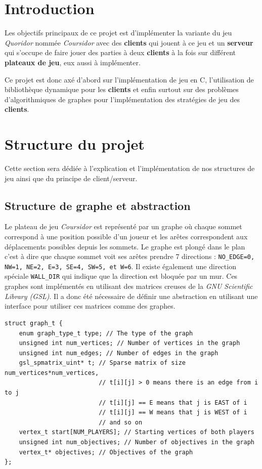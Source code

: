 
\section{Introduction}

Les objectifs principaux de ce projet est d'implémenter la variante du jeu \textit{Quoridor} nommée \textit{Coursidor} avec des \textbf{clients} qui jouent à ce jeu et un \textbf{serveur} qui s'occupe de faire jouer des parties à deux \textbf{clients} à la fois sur différent \textbf{plateaux de jeu}, eux aussi à implémenter.
\bigskip

Ce projet est donc axé d'abord sur l'implémentation de jeu en C, l'utilisation de bibliothèque dynamique pour les \textbf{clients} et enfin surtout sur des problèmes d'algorithmiques de graphes pour l'implémentation des stratégies de jeu des \textbf{clients}.

\section{Structure du projet}

Cette section sera dédiée à l'explication et l'implémentation de nos structures de jeu ainsi que du principe de client/serveur.

\subsection{Structure de graphe et abstraction}

Le plateau de jeu \textit{Coursidor} est représenté par un graphe où chaque sommet correspond à une position possible d'un joueur et les arêtes correspondent aux déplacements possibles depuis les sommets.
Le graphe est plongé dans le plan c'est à dire que chaque sommet voit ses arêtes prendre 7 directions : \texttt{NO\_EDGE=0, NW=1, NE=2, E=3, SE=4, SW=5, et W=6}.
Il existe également une direction spéciale \texttt{WALL\_DIR} qui indique que la direction est bloquée par un mur.
Ces graphes sont implémentés en utilisant des matrices creuses de la \textit{GNU Scientific Library (GSL)}.
Il a donc été nécessaire de définir une abstraction en utilisant une interface pour utiliser ces matrices comme des graphes.

\begin{lstlisting}[style=customc, label={lst:graph}, caption={Définition du type graph\_t}]
  struct graph_t {
    enum graph_type_t type; // The type of the graph
    unsigned int num_vertices; // Number of vertices in the graph
    unsigned int num_edges; // Number of edges in the graph
    gsl_spmatrix_uint* t; // Sparse matrix of size num_vertices*num_vertices,
                          // t[i][j] > 0 means there is an edge from i to j
                          // t[i][j] == E means that j is EAST of i
                          // t[i][j] == W means that j is WEST of i
                          // and so on
    vertex_t start[NUM_PLAYERS]; // Starting vertices of both players
    unsigned int num_objectives; // Number of objectives in the graph
    vertex_t* objectives; // Objectives of the graph
};
\end{lstlisting}


